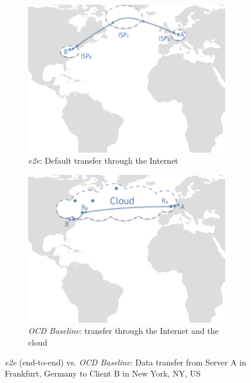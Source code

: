\documentclass[newfonts=false,format=sigconf,10pt,letterpaper]{acmart}
\providecommand{\vs}{vs. }
\begin{document}
\begin{figure}[t]
  \centering
  \begin{subfigure}{.49\textwidth}
  \centering
    \includegraphics[width=0.98\textwidth,clip=true, trim = 0 115mm 0 0]{figures/overlay-vs-e2e002.png}
    \caption{\textit{e2e}: Default  transfer through the Internet}
    \label{fig:e2e-traffic}
\end{subfigure}
\begin{subfigure}{.49\textwidth}
  \centering
    \includegraphics[width=0.98\textwidth, clip, trim = 0 115mm 0 0]{figures/overlay-vs-e2e001.png}
    \caption{\textit{OCD Baseline}: transfer through the Internet and the cloud}
    \label{fig:cloud-traffic}
\end{subfigure}
\caption{\textit{e2e} (end-to-end) \vs \textit{OCD Baseline}: Data transfer from Server A in Frankfurt, Germany to Client B in New York, NY, US 
}
\label{fig:e2e-vs-cloud-traffic}
\end{figure}
\end{document}
